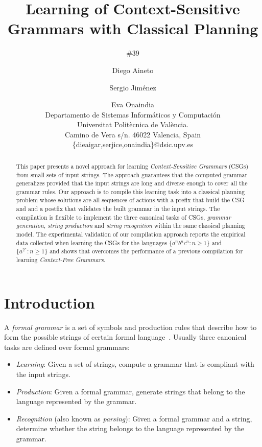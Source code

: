 \documentclass[letterpaper]{article} %
\begin{document}
\title{Learning of Context-Sensitive Grammars with Classical Planning}
\author{\#39}


\author{Diego Aineto\and Sergio Jim\'enez\and Eva Onaindia\\
{\small Departamento de Sistemas Inform\'aticos y Computaci\'on}\\
{\small Universitat Polit\`ecnica de Val\`encia.}\\
{\small Camino de Vera s/n. 46022 Valencia, Spain}\\
{\small \{dieaigar,serjice,onaindia\}@dsic.upv.es}}

\maketitle
\begin{abstract}
This paper presents a novel approach for learning {\em Context-Sensitive Grammars} (CSGs) from small sets of input strings. The approach guarantees that the computed grammar generalizes provided that the input strings are long and diverse enough to cover all the grammar rules.  Our approach is to compile this learning task into a classical planning problem whose solutions are all sequences of actions with a prefix that build the CSG and and a postfix that validates the built grammar in the input strings. The compilation is flexible to implement the three canonical tasks of CSGs, {\it grammar generation}, {\it string production} and {\it string recognition} within the same classical planning model. The experimental validation of our compilation approach reports the empirical data collected when learning the CSGs for the languages $\{a^nb^nc^n : n \geq 1 \}$ and $\{a^{2^n} : n \geq 1 \}$ and shows that overcomes the performance  of a previous compilation for learning {\em Context-Free Grammars}.
\end{abstract}


\section{Introduction}
\label{sec:section1}
A {\em formal grammar} is a set of symbols and production rules that describe how to form the possible strings of certain formal language~\cite{hopcroft:automatatheory:2001}. Usually three canonical tasks are defined over formal grammars:
\begin{itemize}
\item {\it Learning}: Given a set of strings, compute a grammar that is compliant with the input strings.
\item {\it Production}: Given a formal grammar, generate strings that belong to the language represented by the grammar.
\item {\it Recognition} (also known as {\em parsing}): Given a formal grammar and a string, determine whether the string belongs to the language represented by the grammar.
\end{itemize}
\end{document}

